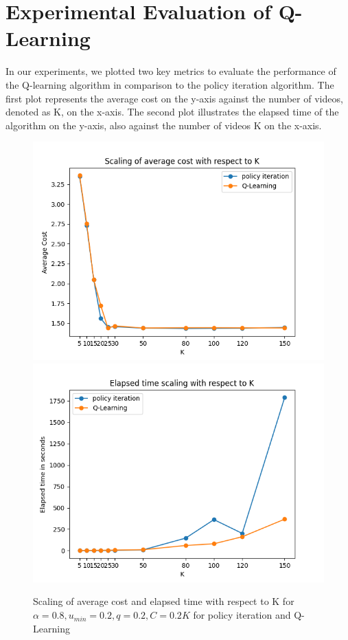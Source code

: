 \documentclass[12pt]{article}
\begin{document}
        \section*{Experimental Evaluation of Q-Learning}
        In our experiments, we plotted two key metrics to evaluate the performance of the Q-learning algorithm in comparison to the policy iteration algorithm.
        The first plot represents the average cost on the y-axis against the number of videos, denoted as K, on the x-axis. The second plot illustrates the elapsed 
        time of the algorithm on the y-axis, also against the number of videos K on the x-axis.
        \begin{figure}[H]
            \centering
            \includegraphics[scale = 0.5]{Figure_69.png}
            \includegraphics[scale = 0.5]{Figure_70.png}
            \caption{Scaling of average cost and elapsed time with respect to K for $\alpha = 0.8, u_{min} = 0.2, q=0.2, C=0.2K$ for policy iteration and Q-Learning}
        \end{figure}
\end{document}
